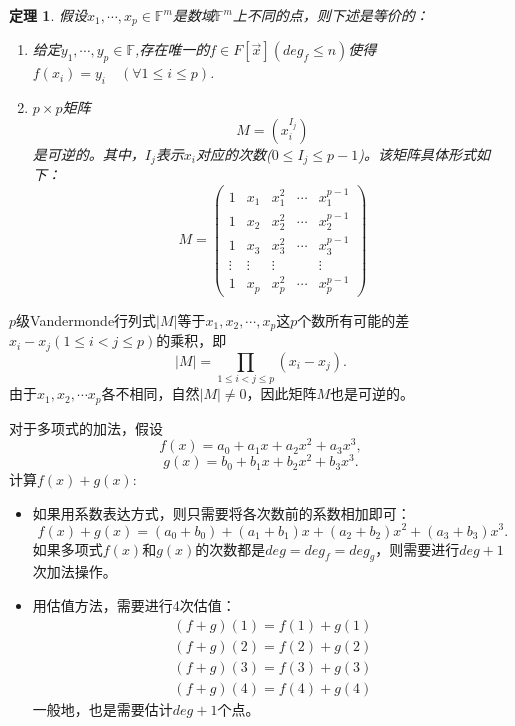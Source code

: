 \documentclass[10pt]{ctexart}
\newtheorem{theorem}{定理}
\begin{document}
\begin{theorem}
    假设$x_1,\cdots,x_p \in \mathbb{F}^m$是数域$\mathbb{F}^m$上不同的点，则下述是等价的：
    \begin{enumerate}
        \item[(1)] 给定$y_1,\cdots,y_p \in \mathbb{F}$,存在唯一的$f \in F[\vec{x}](deg_f \le n)$使得$f(x_i) = y_i \quad (\forall 1 \le i \le p)$.
        \item[(2)] $p \times p$矩阵
        $$
        M = \left(x_i^{I_j}\right)
        $$
        是可逆的。其中，$I_j$表示$x_i$对应的次数($0 \le I_j \le p - 1$)。该矩阵具体形式如下：
        \begin{displaymath}
            M =      \left(
            \begin{matrix}
                1 & x_1 & x_1^2 & \cdots & x_1^{p-1} \\
                1 & x_2 & x_2^2 & \cdots & x_2^{p-1} \\
                1 & x_3 & x_3^2 & \cdots & x_3^{p-1} \\
                \vdots & \vdots & \vdots &  & \vdots \\
                1 & x_p & x_p^2 & \cdots & x_p^{p-1} 
            \end{matrix}
        \right)
        \end{displaymath}
    \end{enumerate}
\end{theorem}
$p$级Vandermonde行列式$|M|$等于$x_1,x_2,\cdots,x_p$这$p$个数所有可能的差$x_i - x_j(1 \le i < j \le p)$的乘积，即
$$
|M| = \prod_{1 \le i < j \le p}(x_i - x_j).
$$
由于$x_1,x_2,\cdots x_p$各不相同，自然$|M| \neq 0$，因此矩阵$M$也是可逆的。

对于多项式的加法，假设
$$
f(x) = a_0 + a_1 x + a_2 x^2 + a_3 x^3,
$$
$$
g(x) = b_0 + b_1 x + b_2 x^2 + b_3 x^3.
$$
计算$f(x) + g(x)$:
\begin{itemize}
    \item 如果用系数表达方式，则只需要将各次数前的系数相加即可：
    $$
    f(x) + g(x) = (a_0 + b_0) + (a_1 + b_1)x + (a_2 + b_2)x^2 + (a_3 + b_3)x^3.
    $$
    如果多项式$f(x)$和$g(x)$的次数都是$deg = deg_f = deg_g$，则需要进行$deg + 1$次加法操作。
    \item 用估值方法，需要进行4次估值：
    \begin{displaymath}
        \begin{aligned}
            (f+g)(1) = f(1) + g(1) \\
            (f+g)(2) = f(2) + g(2) \\
            (f+g)(3) = f(3) + g(3) \\
            (f+g)(4) = f(4) + g(4)
        \end{aligned}
    \end{displaymath}
    一般地，也是需要估计$deg + 1$个点。
\end{itemize}
\end{document}
